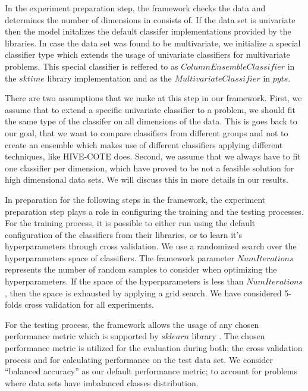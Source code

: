In the experiment preparation step, the framework checks the data and determines the number of dimensions in consists of.
If the data set is univariate then the model initalizes the default classifer implementations provided by the libraries.
In case the data set was found to be multivariate, we initialize a special classifier type which extends the usage of univariate classifiers for multivariate problems.
This special classifier is reffered to as $ColumnEnsembleClassifier$ in the $sktime$ library implementation and as the $MultivariateClassifier$ in $pyts$.

There are two assumptions that we make at this step in our framework.
First, we assume that to extend a specific univariate classifier to a problem, we should fit the same type of the classifer on all dimensions of the data.
This is goes back to our goal, that we want to compare classifiers from different groups and not to create an ensemble which makes use of different classifiers
applying different techniques, like HIVE-COTE does.
Second, we assume that we always have to fit one classifier per dimension, which have proved to be not a feasible solution for high dimensional data sets.
We will discuss this in more details in our results.

In preparation for the following steps in the framework, the experiment preparation step plays a role in configuring the training and the testing processes.
For the training process, it is possible to either run using the default configuration of the classifiers from their libraries, or to learn it's hyperparameters through cross validation.
We use a randomized search over the hyperparameters space of classifiers.
The framework parameter $NumIterations$ represents the number of random samples to consider when optimizing the hyperparameters.
If the space of the hyperparameters is less than $NumIterations$, then the space is exhausted by applying a grid search. We have considered 5-folds cross validation for all experiments.

For the testing process, the framework allows the usage of any chosen performance metric which is supported by $sklearn$ library \cite{scikit-learn}.
The chosen performance metric is utilized for the evaluation during both; the cross validation process and for calculating performance on the test data set.
We consider \enquote{balanced accuracy} as our default performance metric; to account for problems where data sets have imbalanced classes distribution.

